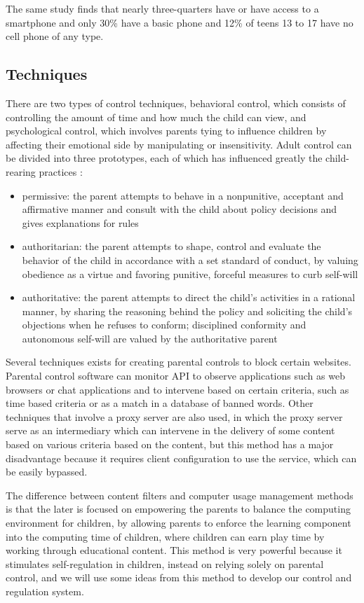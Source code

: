 The same study finds that nearly three-quarters have or have access to a smartphone and only 30\% have a basic phone and 12\% of teens 13 to 17 have no cell phone of any type.

\subsection{Techniques}

There are two types of control techniques, behavioral control, which consists of controlling the amount of time and how much the child can view, and psychological control, which involves parents tying to influence children by affecting their emotional side by manipulating or insensitivity. Adult control can be divided into three prototypes, each of which has influenced greatly the child-rearing practices \parencite{baumrind1966effects}:

\begin{itemize}
\item permissive: the parent attempts to behave in a nonpunitive, acceptant and affirmative manner and consult with the child about policy decisions and gives explanations for rules
\item authoritarian: the parent attempts to shape, control and evaluate the behavior of the child in accordance with a set standard of conduct, by valuing obedience as a virtue and favoring punitive, forceful measures to curb self-will
\item authoritative: the parent attempts to direct the child's activities in a rational manner, by sharing the reasoning behind the policy and soliciting the child's objections when he refuses to conform; disciplined conformity and autonomous self-will are valued by the authoritative parent
\end{itemize}

Several techniques exists for creating parental controls to block certain websites. Parental control software can monitor API to observe applications such as web browsers or chat applications and to intervene based on certain criteria, such as time based criteria or as a match in a database of banned words. Other techniques that involve a proxy server are also used, in which the proxy server serve as an intermediary which can intervene in the delivery of some content based on various criteria based on the content, but this method has a major disadvantage because it requires client configuration to use the service, which can be easily bypassed.

The difference between content filters and computer usage management methods is that the later is focused on empowering the parents to balance the computing environment for children, by allowing parents to enforce the learning component into the computing time of children, where children can earn play time by working through educational content. This method is very powerful because it stimulates self-regulation in children, instead on relying solely on parental control, and we will use some ideas from this method to develop our control and regulation system.

